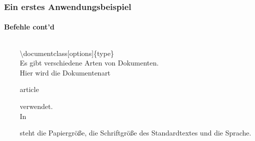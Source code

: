 
\begin{frame}
\frametitle{Ein erstes Anwendungsbeispiel}
\framesubtitle{Befehle cont'd}
\begin{columns}
\begin{column}{0.55\textwidth}
\begin{ttfamily}\footnotesize

\end{ttfamily}
\end{column}

\begin{column}{0.45\textwidth}
\color{nounibaredI}\color{nounibaredI}\textbackslash documentclass\color{black}\color{nounibagreenI}[options]\color{black}\{type\} \\
Es gibt verschiedene Arten von Dokumenten.\\ Hier wird die Dokumentenart
\begin{ttfamily}article\end{ttfamily} verwendet.\\
In \begin{ttfamily}[]\end{ttfamily} steht die Papiergröße, die Schriftgröße des
Standardtextes und die Sprache.\\
\end{column}
\end{columns}
\end{frame}




